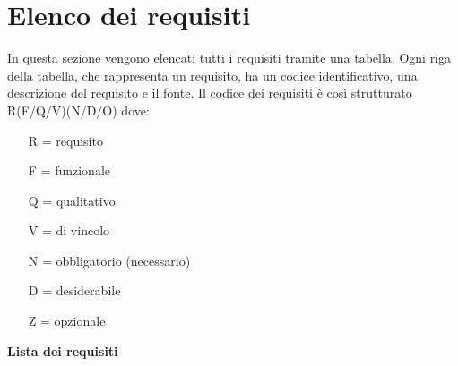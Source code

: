 \chapter{Elenco dei requisiti}
\label{cap:appendice b}
In questa sezione vengono elencati tutti i requisiti tramite una tabella. Ogni riga della tabella, che rappresenta un requisito, ha un codice identificativo, una descrizione del requisito e il fonte.
Il codice dei requisiti è così strutturato R(F/Q/V)(N/D/O) dove:
\begin{enumerate}
	\item[R =] requisito
    \item[F =] funzionale
    \item[Q =] qualitativo
    \item[V =] di vincolo
    \item[N =] obbligatorio (necessario)
    \item[D =] desiderabile
    \item[Z =] opzionale
\end{enumerate}
\textbf{Lista dei requisiti}
